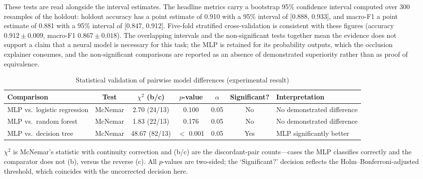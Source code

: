 These tests are read alongside the interval estimates. The headline metrics carry a
bootstrap 95\% confidence interval computed over 300 resamples of the holdout: holdout
accuracy has a point estimate of 0.910 with a 95\% interval of [0.888, 0.933], and
macro-F1 a point estimate of 0.881 with a 95\% interval of [0.847, 0.912]. Five-fold
stratified cross-validation is consistent with these figures (accuracy
$0.912 \pm 0.009$, macro-F1 $0.867 \pm 0.018$). The overlapping intervals and the
non-significant tests together mean the evidence does not support a claim that a neural
model is necessary for this task; the MLP is retained for its probability outputs, which
the occlusion explainer consumes, and the non-significant comparisons are reported as an
absence of demonstrated superiority rather than as proof of equivalence.

\begin{table}[t]
\centering
\caption{Statistical validation of pairwise model differences (experimental result)}
\label{tab:stats}
\footnotesize
\setlength{\tabcolsep}{3pt}
\begin{tabularx}{\linewidth}{@{}L c c c c c L@{}}
\toprule
Comparison & Test & $\chi^2$ (b/c) & $p$-value & $\alpha$ & Significant? & Interpretation \\
\midrule
MLP vs.\ logistic regression & McNemar & 2.70 (24/13) & 0.100 & 0.05 & No & No demonstrated difference \\
MLP vs.\ random forest & McNemar & 1.83 (22/13) & 0.176 & 0.05 & No & No demonstrated difference \\
MLP vs.\ decision tree & McNemar & 48.67 (82/13) & $<$ 0.001 & 0.05 & Yes & MLP significantly better \\
\bottomrule
\end{tabularx}
\par\vspace{3pt}
{\footnotesize\itshape\raggedright $\chi^2$ is McNemar's statistic with continuity
correction and (b/c) are the discordant-pair counts---cases the MLP classifies correctly
and the comparator does not (b), versus the reverse (c). All $p$-values are two-sided; the
`Significant?' decision reflects the Holm--Bonferroni-adjusted threshold, which coincides
with the uncorrected decision here.\par}
\end{table}


